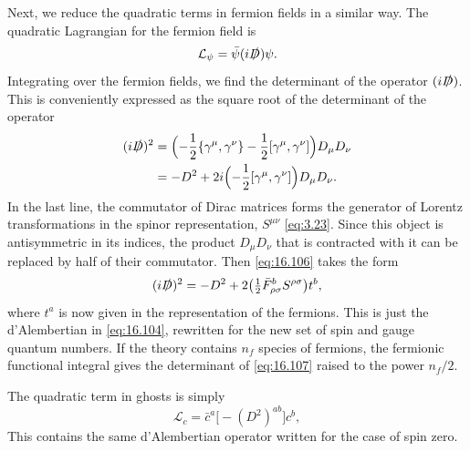 Next, we reduce the quadratic terms in fermion fields in a similar way.  The
quadratic Lagrangian for the fermion field is
\begin{equation}
  \mathcal{L}_\psi = \bar{\psi}(i\slashed{D})\psi .
  \label{eq:16.105}
\end{equation}
Integrating over the fermion fields, we find the determinant of the operator
$(i\slashed{D})$.  This is conveniently expressed as the square root of the
determinant of the operator
\begin{equation}
  \begin{aligned}
    (i\slashed{D})^2 &= \Bigl( -\frac{1}{2}\{ \gamma^\mu, \gamma^\nu \}
      - \frac{1}{2}[\gamma^\mu, \gamma^\nu] \Bigr)D_\mu D_\nu\\
    &= -D^2 + 2i\Bigl( -\frac{1}{2}[\gamma^\mu, \gamma^\nu] \Bigr)D_\mu D_\nu .
  \end{aligned}
  \label{eq:16.106}
\end{equation}
In the last line, the commutator of Dirac matrices forms the generator of
Lorentz transformations in the spinor representation, $S^{\mu\nu}$
\eqref{eq:3.23}.  Since this object is antisymmetric in its indices, the
product $D_\mu D_\nu$ that is contracted with it can be replaced by half of
their commutator.  Then \eqref{eq:16.106} takes the form
\begin{equation}
  (i\slashed{D})^2 = -D^2 + 2\bigl( \tfrac{1}{2}\bar{F}^{b}_{\rho\sigma}
    S^{\rho\sigma} \bigr)t^b ,
  \label{eq:16.107}
\end{equation}
where $t^a$ is now given in the representation of the fermions.  This is just
the d'Alembertian in \eqref{eq:16.104}, rewritten for the new set of spin and
gauge quantum numbers.  If the theory contains $n_f$ species of fermions, the
fermionic functional integral gives the determinant of \eqref{eq:16.107}
raised to the power $n_f/2$.

The quadratic term in ghosts is simply
\begin{equation}
  \mathcal{L}_c = \bar{c}^a\bigl[ -(D^2)^{ab} \bigr]c^b ,
  \label{eq:16.108}
\end{equation}
This contains the same d'Alembertian operator written for the case of spin
zero.

